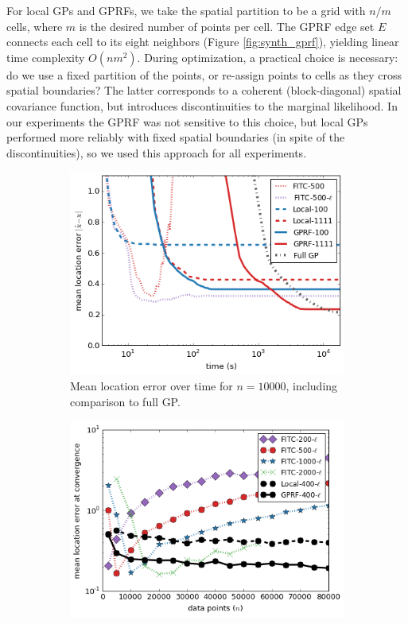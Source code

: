 \documentclass{article}
\begin{document}
For local GPs and GPRFs, we take the spatial partition to be a
grid with $n/m$ cells, where $m$ is the desired number of points per
cell.  The GPRF edge set $E$ connects each cell to its 
eight neighbors (Figure
\ref{fig:synth_gprf}), yielding linear time
complexity $O(nm^2)$. During optimization, a practical choice
is necessary: do we use a fixed partition of the points, or re-assign
points to cells as they cross spatial boundaries? The latter
corresponds to a coherent (block-diagonal) spatial covariance function, but introduces
discontinuities to the marginal likelihood. In our experiments the GPRF was not sensitive to
this choice, but local GPs performed more reliably with fixed
spatial boundaries (in spite of the discontinuities), so we used this
approach for all experiments.
\begin{figure}
\begin{subfigure}[t]{.32\textwidth}
                 \includegraphics[width=\textwidth, trim=0cm -0.0cm 0cm 0 -0.0cm, clip]{truegp_bytime}
                 \caption{Mean location error over time for $n=10000$,
                   including comparison to full GP.}
                 \label{fig:truegp}
\end{subfigure}\hspace{0.3em}
\begin{subfigure}[t]{.33\textwidth}
                 \includegraphics[width=\textwidth,  trim=0cm -0.2cm 0cm 0 -0.0cm, clip]{fitc_scaling_lscale}

\end{subfigure}
\end{figure}
\end{document}
